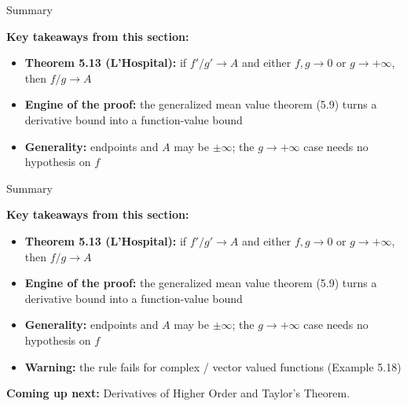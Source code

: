 \documentclass[aspectratio=169,12pt,t]{beamer}
\begin{document}
{%
\begin{frame}{Summary}
  \begin{hlbox}
  \textbf{Key takeaways from this section:}
  \begin{itemize}
    \item \textbf{Theorem 5.13 (L'Hospital):} if $f'/g' \to A$ and either
      $f, g \to 0$ or $g \to +\infty$, then $f/g \to A$
    \item \textbf{Engine of the proof:} the generalized mean value theorem
      (5.9) turns a derivative bound into a function-value bound
    \item \textbf{Generality:} endpoints and $A$ may be $\pm\infty$; the
      $g \to +\infty$ case needs \alert{no} hypothesis on $f$
  \end{itemize}
  \end{hlbox}

\end{frame}

\begin{frame}{Summary}
  \begin{hlbox}
  \textbf{Key takeaways from this section:}
  \begin{itemize}
    \item \textbf{Theorem 5.13 (L'Hospital):} if $f'/g' \to A$ and either
      $f, g \to 0$ or $g \to +\infty$, then $f/g \to A$
    \item \textbf{Engine of the proof:} the generalized mean value theorem
      (5.9) turns a derivative bound into a function-value bound
    \item \textbf{Generality:} endpoints and $A$ may be $\pm\infty$; the
      $g \to +\infty$ case needs \alert{no} hypothesis on $f$
    \item \textbf{Warning:} the rule \alert{fails} for complex / vector
      valued functions (Example 5.18)
  \end{itemize}

  \vspace{0.6em}
  \textbf{Coming up next:} Derivatives of Higher Order and Taylor's Theorem.
  \end{hlbox}


\end{frame}}
\end{document}
